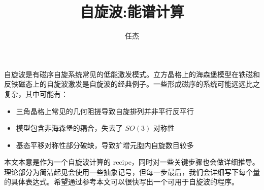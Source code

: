 \documentclass[UTF8]{ctexart}
\begin{document}
\title{自旋波:能谱计算}
\author{任杰}
\date{}

\maketitle
\noindent
自旋波是有磁序自旋系统常见的低能激发模式。立方晶格上的海森堡模型在铁磁和反铁磁态上的自旋波激发是自旋波的经典例子。一些形成磁序的系统可能远远比之复杂，其中可能有：
\begin{itemize}
\item 三角晶格上常见的几何阻搓导致自旋排列并非平行反平行
\item 模型包含非海森堡的耦合，失去了 $SO(3)$ 对称性
\item 基态平移对称性部分破缺，导致扩增元胞内自旋数目较多
\end{itemize}
本文本意是作为一个自旋波计算的 recipe，同时对一些关键步骤也会做详细推导。理论部分为简洁起见会使用一些抽象记号，但每一步最后，我们会详细写下每个量的具体表达式。希望通过参考本文可以很快写出一个可用于自旋波的程序。
\end{document}
